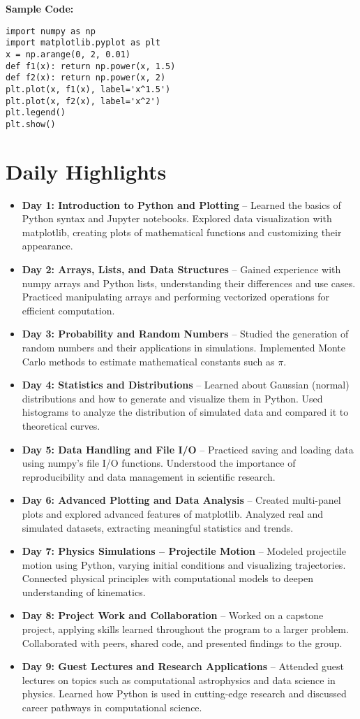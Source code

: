 \documentclass[12pt]{article}
\begin{document}
\noindent\textbf{Sample Code:}
\begin{verbatim}
import numpy as np
import matplotlib.pyplot as plt
x = np.arange(0, 2, 0.01)
def f1(x): return np.power(x, 1.5)
def f2(x): return np.power(x, 2)
plt.plot(x, f1(x), label='x^1.5')
plt.plot(x, f2(x), label='x^2')
plt.legend()
plt.show()
\end{verbatim}


\section*{Daily Highlights}
\begin{itemize}
  \item \textbf{Day 1: Introduction to Python and Plotting} -- Learned the basics of Python syntax and Jupyter notebooks. Explored data visualization with matplotlib, creating plots of mathematical functions and customizing their appearance.
  \item \textbf{Day 2: Arrays, Lists, and Data Structures} -- Gained experience with numpy arrays and Python lists, understanding their differences and use cases. Practiced manipulating arrays and performing vectorized operations for efficient computation.
  \item \textbf{Day 3: Probability and Random Numbers} -- Studied the generation of random numbers and their applications in simulations. Implemented Monte Carlo methods to estimate mathematical constants such as $\pi$.
  \item \textbf{Day 4: Statistics and Distributions} -- Learned about Gaussian (normal) distributions and how to generate and visualize them in Python. Used histograms to analyze the distribution of simulated data and compared it to theoretical curves.
  \item \textbf{Day 5: Data Handling and File I/O} -- Practiced saving and loading data using numpy's file I/O functions. Understood the importance of reproducibility and data management in scientific research.
  \item \textbf{Day 6: Advanced Plotting and Data Analysis} -- Created multi-panel plots and explored advanced features of matplotlib. Analyzed real and simulated datasets, extracting meaningful statistics and trends.
  \item \textbf{Day 7: Physics Simulations -- Projectile Motion} -- Modeled projectile motion using Python, varying initial conditions and visualizing trajectories. Connected physical principles with computational models to deepen understanding of kinematics.
  \item \textbf{Day 8: Project Work and Collaboration} -- Worked on a capstone project, applying skills learned throughout the program to a larger problem. Collaborated with peers, shared code, and presented findings to the group.
  \item \textbf{Day 9: Guest Lectures and Research Applications} -- Attended guest lectures on topics such as computational astrophysics and data science in physics. Learned how Python is used in cutting-edge research and discussed career pathways in computational science.
\end{itemize}
\end{document}
